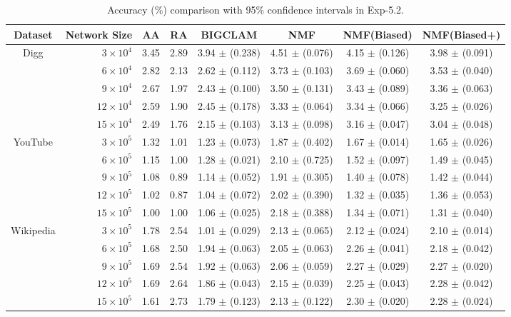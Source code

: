 \documentclass[10pt,journal,compsoc]{IEEEtran}
\newcommand{\NMF}{{\sf NMF}\xspace }
\newcommand{\Biased}{{\sf NMF(Biased)}\xspace}
\newcommand{\Aa}{{\sf AA}\xspace }
\newcommand{\RA}{{\sf RA}\xspace }
\newcommand{\BIGCLAM}{{\sf BIGCLAM}\xspace}
\newcommand{\Digg}{{\sf Digg}\xspace}
\newcommand{\YouTube}{{\sf YouTube}\xspace}
\newcommand{\Wikipedia}{{\sf Wikipedia}\xspace}
\newcommand{\Biasedp}{{\sf NMF(Biased+)}\xspace}
\begin{document}
\begin{table}
\caption{Accuracy (\%) comparison with 95\% confidence intervals in Exp-5.2.}
\label{tab_accuracy_8}
\vspace{-2ex}
\centering
\newcommand{\tabincell}[2]{\begin{tabular}{@{}#1@{}}#2\end{tabular}}
\begin{tabular}{c|r|c|c|c|c|c|c}
\hline \hline Dataset  & Network Size & \Aa & \RA & \BIGCLAM & \NMF & \Biased & \Biasedp  \\
\hline
\multirow{5}{*}{\Digg}
 & $3 \times 10^4 $  & 3.45 & 2.89 & 3.94 $\pm$ (0.238) & 4.51 $\pm$ (0.076) & 4.15 $\pm$ (0.126) & 3.98 $\pm$ (0.091) \\
 & $6 \times 10^4 $  & 2.82 & 2.13 & 2.62 $\pm$ (0.112) & 3.73 $\pm$ (0.103) & 3.69 $\pm$ (0.060) & 3.53 $\pm$ (0.040)  \\
 & $9 \times 10^4 $  & 2.67 & 1.97 & 2.43 $\pm$ (0.100) & 3.50 $\pm$ (0.131) & 3.43 $\pm$ (0.089) & 3.36 $\pm$ (0.063)  \\
 & $12 \times 10^4 $ & 2.59 & 1.90 & 2.45 $\pm$ (0.178) & 3.33 $\pm$ (0.064) & 3.34 $\pm$ (0.066) & 3.25 $\pm$ (0.026) \\
 & $15 \times 10^4 $ & 2.49 & 1.76 & 2.15 $\pm$ (0.103) & 3.13 $\pm$ (0.098) & 3.16 $\pm$ (0.047) & 3.04 $\pm$ (0.048)  \\
\hline
\multirow{5}{*}{\YouTube}
 & $3 \times 10^5 $  & 1.32 & 1.01 & 1.23 $\pm$ (0.073) & 1.87 $\pm$ (0.402) & 1.67 $\pm$ (0.014) & 1.65 $\pm$ (0.026)  \\
 & $6 \times 10^5 $  & 1.15 & 1.00 & 1.28 $\pm$ (0.021) & 2.10 $\pm$ (0.725) & 1.52 $\pm$ (0.097) & 1.49 $\pm$ (0.045)  \\
 & $9 \times 10^5 $  & 1.08 & 0.89 & 1.14 $\pm$ (0.052) & 1.91 $\pm$ (0.305) & 1.40 $\pm$ (0.078) & 1.42 $\pm$ (0.044)  \\
 & $12 \times 10^5 $ & 1.02 & 0.87 & 1.04 $\pm$ (0.072) & 2.02 $\pm$ (0.390) & 1.32 $\pm$ (0.035) & 1.36 $\pm$ (0.053)  \\
 & $15 \times 10^5 $ & 1.00 & 1.00 & 1.06 $\pm$ (0.025) & 2.18 $\pm$ (0.388) & 1.34 $\pm$ (0.071) & 1.31 $\pm$ (0.040)  \\
\hline
\multirow{5}{*}{\Wikipedia}
 & $3 \times 10^5 $  & 1.78 & 2.54 & 1.01 $\pm$ (0.029) & 2.13 $\pm$ (0.065) & 2.12 $\pm$ (0.024) & 2.10 $\pm$ (0.014)  \\
 & $6 \times 10^5 $  & 1.68 & 2.50 & 1.94 $\pm$ (0.063) & 2.05 $\pm$ (0.063) & 2.26 $\pm$ (0.041) & 2.18 $\pm$ (0.042)  \\
 & $9 \times 10^5 $  & 1.69 & 2.54 & 1.92 $\pm$ (0.063) & 2.06 $\pm$ (0.059) & 2.27 $\pm$ (0.029) & 2.27 $\pm$ (0.020)  \\
 & $12 \times 10^5 $ & 1.69 & 2.64 & 1.86 $\pm$ (0.043) & 2.15 $\pm$ (0.039) & 2.25 $\pm$ (0.043) & 2.28 $\pm$ (0.042)  \\
 & $15 \times 10^5 $ & 1.61 & 2.73 & 1.79 $\pm$ (0.123) & 2.13 $\pm$ (0.122) & 2.30 $\pm$ (0.020) & 2.28 $\pm$ (0.024) \\
\hline \hline
\end{tabular}
\vspace{-2ex}
\end{table}
\end{document}
